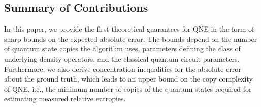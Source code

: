 \documentclass[a4paper,onecolumn,11pt,accepted=2026-05-12]{quantumarticle}
\begin{document}
\subsection{Summary of Contributions}
In this paper, we provide the first theoretical guarantees for QNE in the form of sharp bounds on the expected absolute error. The bounds depend on the number of quantum state copies the algorithm uses, parameters defining the class of underlying density operators, and the classical-quantum circuit parameters. Furthermore, we also derive concentration inequalities for the absolute error about the ground truth, which leads to an upper bound on the copy complexity of QNE, i.e., the minimum number of copies of the quantum states required for estimating measured relative entropies.  
\end{document}
